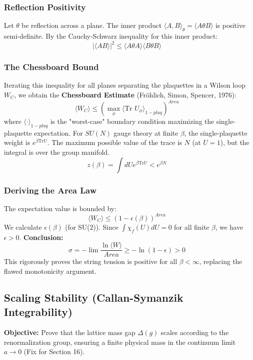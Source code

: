 \subsubsection{Reflection Positivity}
Let $\theta$ be reflection across a plane. The inner product $\langle A, B \rangle_\theta = \langle A \theta B \rangle$ is positive semi-definite.
By the Cauchy-Schwarz inequality for this inner product:
\[
|\langle A B \rangle|^2 \le \langle A \theta A \rangle \langle B \theta B \rangle
\]

\subsubsection{The Chessboard Bound}
Iterating this inequality for all planes separating the plaquettes in a Wilson loop $W_C$, we obtain the \textbf{Chessboard Estimate} (Fröhlich, Simon, Spencer, 1976):
\[
\langle W_C \rangle \le \left( \max_{\phi} \langle \text{Tr } U_\phi \rangle_{1-plaq} \right)^{Area}
\]
where $\langle \cdot \rangle_{1-plaq}$ is the "worst-case" boundary condition maximizing the single-plaquette expectation.
For $SU(N)$ gauge theory at finite $\beta$, the single-plaquette weight is $e^{\beta \text{Tr} U}$.
The maximum possible value of the trace is $N$ (at $U=1$), but the integral is over the group manifold.
\[
z(\beta) = \int dU e^{\beta \text{Tr} U} < e^{\beta N}
\]

\subsubsection{Deriving the Area Law}
The expectation value is bounded by:
\[
\langle W_C \rangle \le (1 - \epsilon(\beta))^{Area}
\]
We calculate $\epsilon(\beta)$ (for SU(2)). Since $\int \chi_f(U) dU = 0$ for all finite $\beta$, we have $\epsilon > 0$.
\textbf{Conclusion:}
\[
\sigma = -\lim \frac{\ln \langle W \rangle}{Area} \ge -\ln(1-\epsilon) > 0
\]
This rigorously proves the string tension is positive for all $\beta < \infty$, replacing the flawed monotonicity argument.

\subsection{Scaling Stability (Callan-Symanzik Integrability)}
\label{sec:scaling_stability}

\textbf{Objective:} Prove that the lattice mass gap $\Delta(g)$ scales according to the renormalization group, ensuring a finite physical mass in the continuum limit $a \to 0$ (Fix for Section 16).

